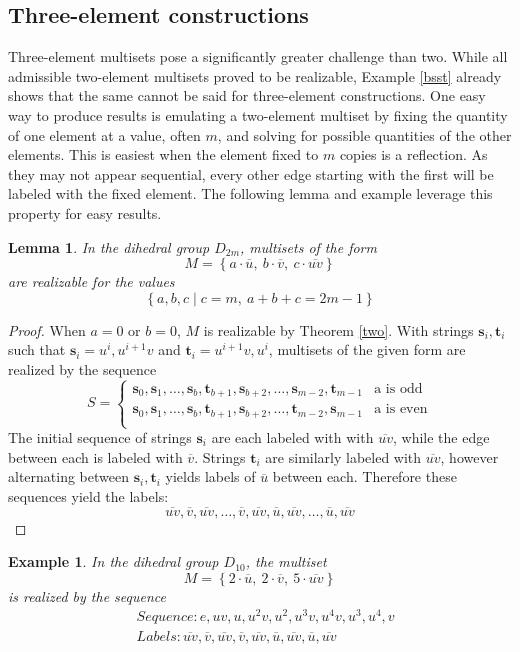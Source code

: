 \documentclass[12pt]{article}
\newtheorem{lem}[thm]{Lemma}
\newtheorem{exa}[thm]{Example}
\newcommand{\ba}{\[\begin{aligned}}
\newcommand{\ea}{\end{aligned}\]}
\newcommand{\setof}[1]{\left\{#1\right\}}
\newcommand{\setdef}[2]{\left\{#1\mid#2\right\}}
\newcommand{\ol}[1]{\overline{#1}} %
\newcommand{\bo}[1]{\textbf{#1}}%
\begin{document}
\subsection{Three-element constructions}\label{secthree}
Three-element multisets pose a significantly greater challenge than two. While all admissible
two-element multisets proved to be realizable, Example \ref{bsst} already shows that the same
cannot be said for three-element constructions. One easy way to produce results is emulating
a two-element multiset by fixing the quantity of one element at a value, often $m$, and solving
for possible quantities of the other elements. This is easiest when the element fixed to
$m$ copies is a reflection. As they may not appear sequential, every other edge starting
with the first will be labeled with the fixed element. The following lemma and example leverage
this property for easy results.

\begin{lem} \label{fixc} In the dihedral group $D_{2m}$, multisets of the form
$$M = \setof{a \cdot \ol{u},\ b \cdot \ol{v},\ c \cdot \ol{uv}}$$
are realizable for the values
$$\setdef{a, b, c}{c = m,\ a + b + c = 2m - 1}$$
\end{lem}
\begin{proof}
  When $a = 0$ or $b = 0$, $M$ is realizable by Theorem \ref{two}.
  With strings $\bo{s}_i, \bo{t}_i$ such that $\bo{s}_i = u^i, u^{i+1}v$ and
  $\bo{t}_i = u^{i+1}v, u^i$, multisets of the given form are realized by the sequence
  $$
  S = \begin{cases}
    \bo{s}_0, \bo{s}_1, \dots, \bo{s}_b, \bo{t}_{b+1}, \bo{s}_{b+2}, \dots, \bo{s}_{m-2}, \bo{t}_{m-1} & \text{a is odd}\\
    \bo{s}_0, \bo{s}_1, \dots, \bo{s}_b, \bo{t}_{b+1}, \bo{s}_{b+2}, \dots, \bo{t}_{m-2}, \bo{s}_{m-1} & \text{a is even}\\
    \end{cases}
  $$
  The initial sequence of strings $\bo{s}_i$ are each labeled with with $\ol{uv}$, while the edge between each
  is labeled with $\ol{v}$. Strings $\bo{t}_i$ are similarly labeled with $\ol{uv}$, however alternating between
  $\bo{s}_i, \bo{t}_i$ yields labels of $\ol{u}$ between each. Therefore these sequences yield the labels:
  $$\ol{uv}, \ol{v}, \ol{uv}, \dots, \ol{v}, \ol{uv}, \ol{u}, \ol{uv}, \dots, \ol{u}, \ol{uv}$$
\end{proof}
\begin{exa}
  In the dihedral group $D_{10}$, the multiset
  $$M = \setof{2 \cdot \ol{u},\ 2 \cdot \ol{v},\ 5 \cdot \ol{uv}}$$
  is realized by the sequence
  \ba
  &Sequence : e, uv, u, u^2v, u^2, u^3v, u^4v, u^3, u^4, v\\
  &Labels : \ol{uv}, \ol{v}, \ol{uv}, \ol{v}, \ol{uv}, \ol{u}, \ol{uv}, \ol{u}, \ol{uv}
  \ea
\end{exa}
\end{document}
